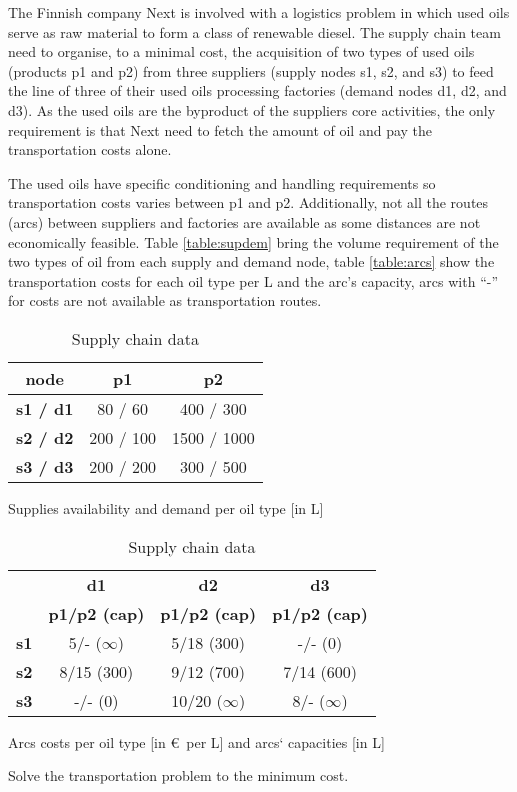 The Finnish company Next is involved with a logistics problem in which used oils serve as raw material to form a class of renewable diesel. The supply chain team need to organise, to a minimal cost, the acquisition of two types of used oils (products p1 and p2) from three suppliers (supply nodes s1, s2, and s3) to feed the line of three of their used oils processing factories (demand nodes d1, d2, and d3). As the used oils are the byproduct of the suppliers core activities, the only requirement is that Next need to fetch the amount of oil and pay the transportation costs alone.

The used oils have specific conditioning and handling requirements so transportation costs varies between p1 and p2. Additionally, not all the routes (arcs) between suppliers and factories are available as some distances are not economically feasible. Table \ref{table:supdem} bring the volume requirement of the two types of oil from each supply and demand node, table \ref{table:arcs} show the transportation costs for each oil type per L and the arc's capacity, arcs with ``-'' for costs are not available as transportation routes.


\begin{table}[h!]
	\begin{subtable}[h]{0.4\textwidth}
		\begin{center}
		\begin{tabular}{c|cc}
			\textbf{node} & \textbf{p1} & \textbf{p2} \\
			\hline
			\textbf{s1 / d1} & 80 / 60 & 400 / 300 \\
			\textbf{s2 / d2} & 200 / 100 & 1500 / 1000 \\
			\textbf{s3 / d3} & 200 / 200 & 300 / 500 \\
		\end{tabular}
		\end{center}
		\caption{Supplies availability and demand per oil type [in L]}
		\label{table:supdem}
	\end{subtable}
	\hfill
	\begin{subtable}[h]{0.55\textwidth}
		\begin{center}
			\begin{tabular}{c|ccc}
				 & \textbf{d1} & \textbf{d2} & \textbf{d3}\\
				 & \textbf{p1/p2 (cap)} & \textbf{p1/p2 (cap)} & \textbf{p1/p2 (cap)}\\
				\hline
				\textbf{s1} & 5/- ($\infty$) & 5/18 (300) & -/- (0)\\
				\textbf{s2} & 8/15 (300) & 9/12 (700) & 7/14 (600)\\
				\textbf{s3} & -/- (0) & 10/20 ($\infty$) & 8/- ($\infty$)\\
			\end{tabular}
		\end{center}
		\caption{Arcs costs per oil type [in \euro \ per L] and arcs` capacities [in L]}
		\label{table:arcs}
	\end{subtable}
	\caption{Supply chain data}
	\label{table:sc}
\end{table}

Solve the transportation problem to the minimum cost.
